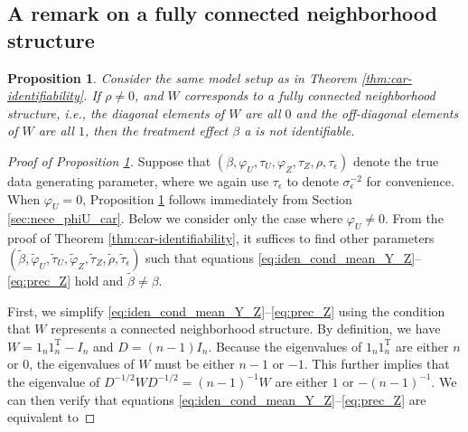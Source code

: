 \documentclass[11pt]{article}
\newtheorem{proposition}{Proposition}
\theoremstyle{definition}
\theoremstyle{remark}
\def\top{{ \mathrm{\scriptscriptstyle T} }}
\begin{document}
\subsection{A remark on a fully connected neighborhood structure}


\begin{proposition}\label{prop:car-fullyconnected-nonid}
Consider the same model setup as in Theorem \ref{thm:car-identifiability}. 
If 
$\rho \ne 0$, and
$W$ corresponds to a fully connected neighborhood structure, i.e., the diagonal elements of $W$ are all $0$ and the off-diagonal elements of $W$ are all $1$, 
then the treatment effect $\beta$ a
is 
not identifiable.
\end{proposition}

\begin{proof}[Proof of Proposition \ref{prop:car-fullyconnected-nonid}]
Suppose that $(\beta, \varphi_U, \tau_U, \varphi_Z, \tau_Z, \rho, \tau_\epsilon)$ denote the true data generating parameter, where we again use $\tau_{\epsilon}$ to denote $\sigma_{\epsilon}^{-2}$ for convenience. 
When $\varphi_U = 0$, Proposition \ref{prop:car-fullyconnected-nonid} follows immediately from Section \ref{sec:nece_phiU_car}. 
Below we consider only the case where $\varphi_U \ne 0$. 
From the proof of Theorem \ref{thm:car-identifiability}, it suffices to find other parameters $(\tilde\beta, \tilde\varphi_U, \tilde\tau_U, \tilde\varphi_Z, \tilde\tau_Z, \tilde\rho, \tilde\tau_\epsilon)$ such that equations \eqref{eq:iden_cond_mean_Y_Z}--\eqref{eq:prec_Z} hold and $\tilde\beta \ne \beta$. 

First, we simplify \eqref{eq:iden_cond_mean_Y_Z}--\eqref{eq:prec_Z} using the condition that $W$ represents a connected neighborhood structure. 
By definition, we have $W = 1_{n} 1_{n}^\top - I_n$ and $D = (n-1)I_n$. 
Because the eigenvalues of $1_{n} 1_{n}^\top$ are either $n$ or $0$, 
the eigenvalues of $W$ must be either $n-1$ or $-1$. 
This further implies that the eigenvalue of $D^{-1/2}WD^{-1/2} = (n-1)^{-1} W$ are either $1$ or $-(n-1)^{-1}$. 
We can then verify that equations \eqref{eq:iden_cond_mean_Y_Z}--\eqref{eq:prec_Z}  are equivalent to 


\end{proof}
\end{document}
